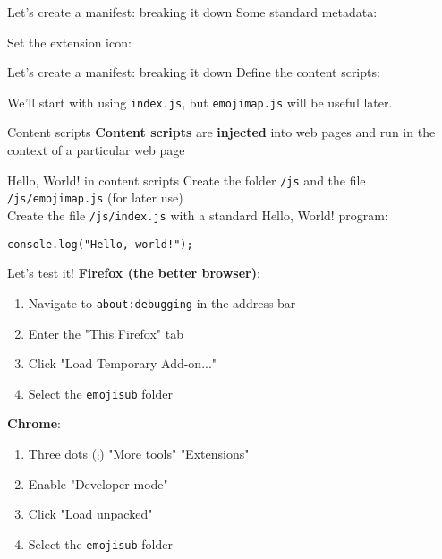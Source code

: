 \documentclass[../index.tex]{subfiles}
\begin{document}
\renewcommand{\currenttitle}{Let's create a manifest: breaking it down}
\begin{frame}[fragile]{\currenttitle}
  Some standard metadata:
  

  Set the extension icon:
  
\end{frame}

\begin{frame}[fragile]{\currenttitle}
  Define the content scripts:
  

  We'll start with using \texttt{index.js}, but \texttt{emojimap.js} will be
  useful later.
\end{frame}

\renewcommand{\currenttitle}{Content scripts}
\begin{frame}[fragile]{\currenttitle}
  \textbf{Content scripts} are \textbf{injected} into web pages and run in the
  context of a particular web page
\end{frame}

\renewcommand{\currenttitle}{Hello, World! in content scripts}
\begin{frame}[fragile]{\currenttitle}
  Create the folder \texttt{/js} and the file \texttt{/js/emojimap.js} (for later use) \\[1.5em]

  Create the file \texttt{/js/index.js} with a standard Hello, World! program:
  \begin{lstlisting}[language=ES6,basicstyle=\ttfamily\small]
    console.log("Hello, world!");
  \end{lstlisting}
\end{frame}

\renewcommand{\currenttitle}{Let's test it!}
\begin{frame}[fragile]{\currenttitle}
  \textbf{Firefox (the better browser)}:
  \begin{enumerate}
    \item Navigate to \texttt{about:debugging} in the address bar
    \item Enter the "This Firefox" tab
    \item Click "Load Temporary Add-on..."
    \item Select the \texttt{emojisub} folder
  \end{enumerate}

  \textbf{Chrome}:
  \begin{enumerate}
    \item Three dots ($\vdots$) \textrightarrow "More tools" \textrightarrow
          "Extensions"
    \item Enable "Developer mode"
    \item Click "Load unpacked"
    \item Select the \texttt{emojisub} folder
  \end{enumerate}
\end{frame}
\end{document}
